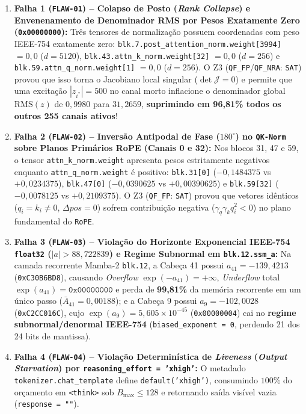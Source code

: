 \documentclass[11pt,a4paper]{article}
\theoremstyle{definition}
\begin{document}
\begin{enumerate}
    \item \textbf{Falha 1 (\texttt{FLAW-01}) -- Colapso de Posto (\textit{Rank Collapse}) e Envenenamento de Denominador RMS por Pesos Exatamente Zero (\texttt{0x00000000}):} Três tensores de normalização possuem coordenadas com peso IEEE-754 exatamente zero: \texttt{blk.7.post\_attention\_norm.weight[3994]} $= 0{,}0$ ($d=5120$), \texttt{blk.43.attn\_k\_norm.weight[32]} $= 0{,}0$ ($d=256$) e \texttt{blk.59.attn\_q\_norm.weight[1]} $= 0{,}0$ ($d=256$). O Z3 (\texttt{QF\_FP}/\texttt{QF\_NRA}: \texttt{SAT}) provou que isso torna o Jacobiano local singular ($\det \mathcal{J} = 0$) e permite que uma excitação $|z_{i^*}| = 500$ no canal morto inflacione o denominador global $\text{RMS}(z)$ de $0{,}9980$ para $31{,}2659$, \textbf{suprimindo em 96,81\% todos os outros 255 canais ativos}!
    \item \textbf{Falha 2 (\texttt{FLAW-02}) -- Inversão Antipodal de Fase ($180^\circ$) no \texttt{QK-Norm} sobre Planos Primários RoPE (Canais 0 e 32):} Nos blocos 31, 47 e 59, o tensor \texttt{attn\_k\_norm.weight} apresenta pesos estritamente negativos enquanto \texttt{attn\_q\_norm.weight} é positivo: \texttt{blk.31[0]} ($-0{,}1484375$ vs $+0{,}0234375$), \texttt{blk.47[0]} ($-0{,}0390625$ vs $+0{,}00390625$) e \texttt{blk.59[32]} ($-0{,}0078125$ vs $+0{,}2109375$). O Z3 (\texttt{QF\_FP}: \texttt{SAT}) provou que vetores idênticos ($q_i = k_i \neq 0$, $\Delta pos = 0$) sofrem contribuição negativa ($\gamma_q\gamma_k q_i^2 < 0$) no plano fundamental do \texttt{RoPE}.
    \item \textbf{Falha 3 (\texttt{FLAW-03}) -- Violação do Horizonte Exponencial IEEE-754 \texttt{float32} ($|a| > 88{,}722839$) e Regime Subnormal em \texttt{blk.12.ssm\_a}:} Na camada recorrente Mamba-2 \texttt{blk.12}, a Cabeça 41 possui $a_{41} = -139{,}4213$ (\texttt{0xC30B6BD8}), causando \textit{Overflow} $\exp(-a_{41}) = +\infty$, \textit{Underflow} total $\exp(a_{41}) = \texttt{0x00000000}$ e perda de \textbf{99,81\%} da memória recorrente em um único passo ($\bar{A}_{41} = 0{,}00188$); e a Cabeça 9 possui $a_9 = -102{,}0028$ (\texttt{0xC2CC016C}), cujo $\exp(a_9) = 5{,}605 \times 10^{-45}$ (\texttt{0x00000004}) cai no \textbf{regime subnormal/denormal IEEE-754} (\texttt{biased\_exponent = 0}, perdendo 21 dos 24 bits de mantissa).
    \item \textbf{Falha 4 (\texttt{FLAW-04}) -- Violação Determinística de \textit{Liveness} (\textit{Output Starvation}) por \texttt{reasoning\_effort = 'xhigh'}:} O metadado \texttt{tokenizer.chat\_template} define \texttt{default('xhigh')}, consumindo $100\%$ do orçamento em \texttt{<think>} sob $B_{\max} \le 128$ e retornando saída visível vazia (\texttt{response = ""}).
\end{enumerate}
\end{document}
